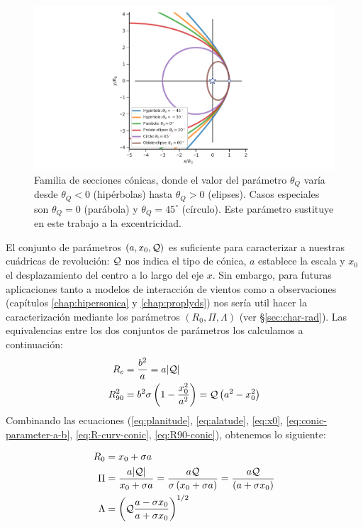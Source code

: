 \begin{figure}
  \centering
  \includegraphics[width = \linewidth]{./Figures/conic1}
  \caption[Familia de secciones cónicas]{Familia de secciones cónicas, donde el valor del parámetro $\theta_Q$ varía desde $\theta_Q < 0$ (hipérbolas) hasta $\theta_Q > 0$ (elipses). Casos especiales son $\theta_Q = 0$ (parábola) y $\theta_Q = 45^\circ$ (círculo). Este parámetro sustituye en este trabajo a la excentricidad.}
  \label{fig:conics-family}
\end{figure}
El conjunto de parámetros $(a, x_0, \mathcal{Q})$ es suficiente para caracterizar a nuestras cuádricas de revolución: $\mathcal{Q}$ nos indica el tipo de cónica, $a$ establece la escala y $x_0$ el desplazamiento del centro a lo largo del eje $x$. Sin embargo, para futuras aplicaciones tanto a modelos de interacción de vientos como a observaciones (capítulos \ref{chap:hipersonica} y \ref{chap:proplyds}) nos sería util hacer la caracterización mediante los parámetros $(R_0, \Pi, \Lambda)$ (ver \S \ref{sec:char-rad}). Las equivalencias entre los dos conjuntos de parámetros los calculamos a continuación:
\begin{align} 
  R_c &= \frac{b^2}{a} = a|\mathcal{Q}|\label{eq:R-curv-conic}\\
  R^2_{90} &= b^2\sigma\left(1 - \frac{x^2_0}{a^2}\right) = \mathcal{Q}\left(a^2 - x^2_0\right)\label{eq:R90-conic} 
\end{align}
Combinando las ecuaciones (\ref{eq:planitude}, \ref{eq:alatude}, \ref{eq:x0}, \ref{eq:conic-parameter-a-b}, \ref{eq:R-curv-conic}, \ref{eq:R90-conic}), obtenemos lo siguiente:

\begin{align}
  R_0 &= x_0 + \sigma a \label{eq:R0}\\
  \Pi &= \frac{a|\mathcal{Q}|}{x_0 + \sigma a} = \frac{a\mathcal{Q}}{\sigma\left(x_0 + \sigma a\right)} = \frac{a\mathcal{Q}}{\left(a + \sigma x_0\right)}\label{eq:quadric-planitude}\\
  \Lambda &= \left(\mathcal{Q}\frac{a-\sigma x_0}{a + \sigma x_0}\right)^{1/2}
\end{align}

